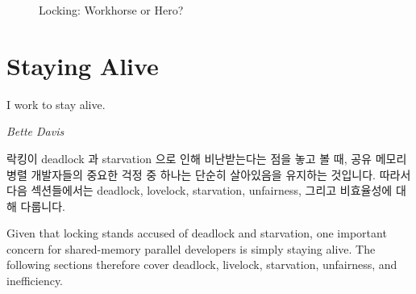 \begin{figure}[tb]
\centering
{}
\caption{Locking: Workhorse or Hero?}
\end{figure}

\section{Staying Alive}
\label{sec:locking:Staying Alive}
%
\epigraph{I work to stay alive.}{\emph{Bette Davis}}

락킹이 deadlock 과 starvation 으로 인해 비난받는다는 점을 놓고 볼 때, 공유
메모리 병렬 개발자들의 중요한 걱정 중 하나는 단순히 살아있음을 유지하는
것입니다.
따라서 다음 섹션들에서는 deadlock, lovelock, starvation, unfairness, 그리고
비효율성에 대해 다룹니다.

\iffalse

Given that locking stands accused of deadlock and starvation,
one important concern for shared-memory parallel developers is
simply staying alive.
The following sections therefore cover deadlock, livelock, starvation,
unfairness, and inefficiency.

